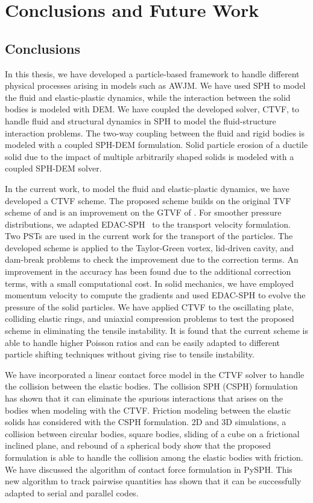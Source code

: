 \chapter{Conclusions and Future Work}
\label{chap:conclusions}

\section{Conclusions}
In this thesis, we have developed a particle-based framework to handle different
physical processes arising in models such as AWJM. We have used SPH to model the
fluid and elastic-plastic dynamics, while the interaction between the solid
bodies is modeled with DEM. We have coupled the developed solver, CTVF, to
handle fluid and structural dynamics in SPH to model the fluid-structure
interaction problems. The two-way coupling between the fluid and rigid bodies is
modeled with a coupled SPH-DEM formulation. Solid particle erosion of a ductile
solid due to the impact of multiple arbitrarily shaped solids is modeled with a
coupled SPH-DEM solver.


In the current work, to model the fluid and elastic-plastic dynamics, we have
developed a CTVF scheme. The proposed scheme builds on the original TVF scheme
of \citet{Adami2013} and is an improvement on the GTVF of
\citet{zhang_hu_adams17}. For smoother pressure distributions, we adapted
EDAC-SPH~\cite{edac-sph:cf:2019} to the transport velocity formulation. Two PSTs
are used in the current work for the transport of the particles. The developed
scheme is applied to the Taylor-Green vortex, lid-driven cavity, and dam-break
problems to check the improvement due to the correction terms. An improvement in
the accuracy has been found due to the additional correction terms, with a small
computational cost. In solid mechanics, we have employed momentum velocity to
compute the gradients and used EDAC-SPH to evolve the pressure of the solid
particles. We have applied CTVF to the oscillating plate, colliding elastic
rings, and uniaxial compression problems to test the proposed scheme in
eliminating the tensile instability. It is found that the current scheme is able
to handle higher Poisson ratios and can be easily adapted to different particle
shifting techniques without giving rise to tensile instability.

We have incorporated a linear contact force model in the CTVF solver to handle
the collision between the elastic bodies. The collision SPH (CSPH) formulation
has shown that it can eliminate the spurious interactions that arises on the
bodies when modeling with the CTVF. Friction modeling between the elastic solids
has considered with the CSPH formulation. 2D and 3D simulations, a collision
between circular bodies, square bodies, sliding of a cube on a frictional
inclined plane, and rebound of a spherical body show that the proposed
formulation is able to handle the collision among the elastic bodies with
friction. We have discussed the algorithm of contact force formulation in PySPH.
This new algorithm to track pairwise quantities has shown that it can be
successfully adapted to serial and parallel codes.


